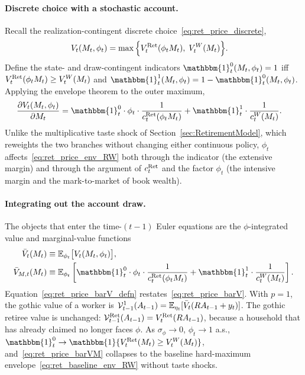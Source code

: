 \paragraph{Discrete choice with a stochastic account.}
Recall the realization-contingent discrete choice~\eqref{eq:ret_price_discrete},
\begin{align}
	V_t(M_t,\phi_t)
	&= \max\Big\{V_t^{\mathrm{Ret}}(\phi_t M_t),\; V_t^{W}(M_t)\Big\}.
\end{align}
Define the state- and draw-contingent indicators $\mathbbm{1}_t^{0}(M_t,\phi_t)=1$ iff $V_t^{\mathrm{Ret}}(\phi_t M_t)\ge V_t^{W}(M_t)$ and $\mathbbm{1}_t^{1}(M_t,\phi_t)=1-\mathbbm{1}_t^{0}(M_t,\phi_t)$. Applying the envelope theorem to the outer maximum,
\begin{align}
	\frac{\partial V_t(M_t,\phi_t)}{\partial M_t}
	&= \mathbbm{1}_t^{0}\cdot\phi_t\cdot\frac{1}{c_t^{\Ret}(\phi_t M_t)}
	+\mathbbm{1}_t^{1}\cdot\frac{1}{c_t^{W}(M_t)}.
	\label{eq:ret_price_env_RW}
\end{align}
Unlike the multiplicative taste shock of Section~\ref{sec:RetirementModel}, which reweights the two branches without changing either continuous policy, $\phi_t$ affects~\eqref{eq:ret_price_env_RW} both through the indicator (the extensive margin) and through the argument of $c_t^{\mathrm{Ret}}$ and the factor $\phi_t$ (the intensive margin and the mark-to-market of book wealth).

\paragraph{Integrating out the account draw.}
The objects that enter the time-$(t-1)$ Euler equations are the $\phi$-integrated value and marginal-value functions
\begin{align}
	\bar V_t(M_t)
	&\equiv \mathbb{E}_{\phi_t}\big[V_t(M_t,\phi_t)\big],
	\label{eq:ret_price_barV_defn}\\
	\bar V_{M,t}(M_t)
	&\equiv \mathbb{E}_{\phi_t}\left[
		\mathbbm{1}_t^{0}\cdot\phi_t\cdot\frac{1}{c_t^{\Ret}(\phi_t M_t)}
		+\mathbbm{1}_t^{1}\cdot\frac{1}{c_t^{W}(M_t)}
	\right].
	\label{eq:ret_price_barVM}
\end{align}
Equation~\eqref{eq:ret_price_barV_defn} restates~\eqref{eq:ret_price_barV}. With $p=1$, the gothic value of a worker is $\mathcal{V}_{t-1}^{1}(A_{t-1})=\mathbb{E}_{\eta_t}[\bar V_t(R A_{t-1}+y_t)]$. The gothic retiree value is unchanged: $\mathcal{V}_{t-1}^{\mathrm{Ret}}(A_{t-1})=V_t^{\mathrm{Ret}}(R A_{t-1})$, because a household that has already claimed no longer faces $\phi$. As $\sigma_\phi\to 0$, $\phi_t\to 1$ a.s., $\mathbbm{1}_t^{0}\to\mathbbm{1}\{V_t^{\Ret}(M_t)\ge V_t^{W}(M_t)\}$, and~\eqref{eq:ret_price_barVM} collapses to the baseline hard-maximum envelope~\eqref{eq:ret_baseline_env_RW} without taste shocks.

